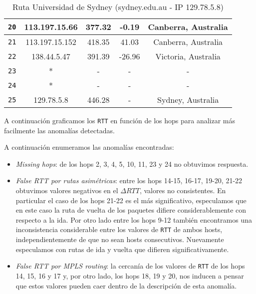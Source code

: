 \begin{table}[ht]
\begin{center}
\begin{tabular}{|c|c|c|c|c|}
    \texttt{20} & 113.197.15.66   & 377.32  & -0.19   & Canberra, Australia   \\ \hline
    \texttt{21} & 113.197.15.152  & 418.35  & 41.03   & Canberra, Australia    \\ \hline
    \texttt{22} & 138.44.5.47     & 391.39  & -26.96  & Victoria, Australia   \\ \hline
    \texttt{23} & *               & -       & -       & -                \\ \hline
    \texttt{24} & *               & -       & -       & -   \\ \hline
    \texttt{25} & 129.78.5.8      & 446.28  & -       & Sydney, Australia   \\ \hline
    \end{tabular}
    \caption{Ruta Universidad de Sydney (sydney.edu.au - IP 129.78.5.8)}
\end{center}\end{table}

A continuación graficamos los \texttt{RTT} en función de los hops para analizar más facilmente las anomalías detectadas.

\begin{figure}[H]
    \centering
\end{figure}

A continuación enumeramos las anomalías encontradas:
\begin{itemize}
    \item \textit{Missing hops}: de los hops 2, 3, 4, 5, 10, 11, 23 y 24 no obtuvimos respuesta.
    \item \textit{False RTT por rutas asimétricas}: entre los hops 14-15, 16-17, 19-20, 21-22 obtuvimos valores negativos en el $\Delta RTT$, valores no consistentes. En particular el caso de los hops 21-22 es el más significativo, especulamos que en este caso la ruta de vuelta de los paquetes difiere considerablemente con respecto a la ida. Por otro lado entre los hops 9-12 también encontramos una inconsistencia considerable entre los valores de \texttt{RTT} de ambos hosts, independientemente de que no sean hosts consecutivos. Nuevamente especulamos con rutas de ida y vuelta que difieren significativamente.
    \item \textit{False RTT por MPLS routing}: la cercanía de los valores de \texttt{RTT} de los hops 14, 15, 16 y 17 y, por otro lado, los hops 18, 19 y 20, nos inducen a pensar que estos valores pueden caer dentro de la descripción de esta anomalía.
\end{itemize}

